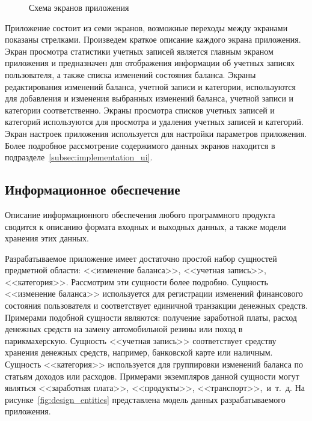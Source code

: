 \begin{figure}[h!]
  \centering
  \caption{Схема экранов приложения}
  \label{fig:design_activities}
\end{figure}

Приложение состоит из семи экранов, возможные переходы между экранами
показаны стрелками. Произведем краткое описание каждого экрана приложения.
Экран просмотра статистики учетных записей является главным экраном приложения
и предназначен для отображения информации об учетных записях пользователя,
а также списка изменений состояния баланса.
Экраны редактирования изменений баланса, учетной записи и категории,
используются для добавления и изменения выбранных изменений баланса,
учетной записи и категории соответственно.
Экраны просмотра списков учетных записей и категорий используются
для просмотра и удаления учетных записей и категорий.
Экран настроек приложения используется для настройки параметров приложения.
Более подробное рассмотрение содержимого данных экранов находится
в подразделе~\ref{subsec:implementation_ui}.

\subsection{Информационное обеспечение}
\label{subsec:design_information}

Описание информационного обеспечения любого программного продукта сводится
к описанию формата входных и выходных данных, а также модели хранения
этих данных.

Разрабатываемое приложение имеет достаточно простой набор сущностей
предметной области: <<изменение баланса>>, <<учетная запись>>, <<категория>>.
Рассмотрим эти сущности более подробно.
Сущность <<изменение баланса>> используется для регистрации изменений
финансового состояния пользователя и соответствует единичной транзакции
денежных средств.
Примерами подобной сущности являются: получение заработной платы,
расход денежных средств на замену автомобильной резины или поход в
парикмахерскую.
Сущность <<учетная запись>> соответствует средству хранения денежных
средств, например, банковской карте или наличным.
Сущность <<категория>> используется для группировки изменений баланса
по статьям доходов или расходов. Примерами экземпляров данной сущности
могут являться <<заработная плата>>, <<продукты>>, <<транспорт>>,~и~т.~д.
На рисунке~\ref{fig:design_entities} представлена модель данных
разрабатываемого приложения.

